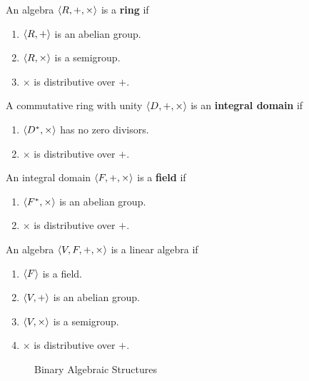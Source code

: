 \begin{definition}
	An algebra $\left\langle R,+,\times \right\rangle$ is a \textbf{ring} if
	\begin{enumerate}
		\item $\left\langle R,+ \right\rangle$ is an abelian group.
		\item $\left\langle R,\times \right\rangle$ is a semigroup.
		\item $\times$ is distributive over $+$.
	\end{enumerate}
\end{definition}

\begin{definition}
	A commutative ring with unity $\left\langle D,+,\times \right\rangle$ is an \textbf{integral domain} if
	\begin{enumerate}
		\item $\left\langle D^\ast,\times \right\rangle$ has no zero divisors.
		\item $\times$ is distributive over $+$.
	\end{enumerate}
\end{definition}

\begin{definition}
	An integral domain $\left\langle F,+,\times \right\rangle$ is a \textbf{field} if
	\begin{enumerate}
		\item $\left\langle F^\ast,\times \right\rangle$ is an abelian group.
		\item $\times$ is distributive over $+$.
	\end{enumerate}
\end{definition}

\begin{definition}
	An algebra $\left\langle V,F,+,\times \right\rangle$ is a linear algebra if
	\begin{enumerate}
		\item $\left\langle F \right\rangle$ is a field.
		\item $\left\langle V,+ \right\rangle$ is an abelian group.
		\item $\left\langle V,\times \right\rangle$ is a semigroup.
		\item $\times$ is distributive over $+$.
	\end{enumerate}
\end{definition}

\begin{figure}[h]
	\centering
{}
	\caption{Binary Algebraic Structures}
\end{figure}

